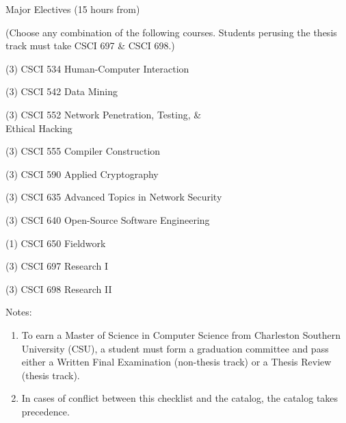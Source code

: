 \begin{reqgroup}{Major Electives (15 hours from)}
\begin{center}%
(Choose any combination of the following courses. Students perusing the thesis track must take CSCI 697 \& CSCI 698.)\vspace{-0.5em}%
\end{center}%
\begin{checklist}
\begin{minipage}[t]{0.5\linewidth}
	\item (3) CSCI 534  Human-Computer Interaction
	\item (3) CSCI 542  Data Mining
	\item (3) CSCI 552  Network Penetration, Testing, \&\\Ethical Hacking
	\item (3) CSCI 555  Compiler Construction
	\item (3) CSCI 590  Applied Cryptography
\end{minipage}
\begin{minipage}[t]{0.5\linewidth}
	\item (3) CSCI 635  Advanced Topics in Network Security
	\item (3) CSCI 640  Open-Source Software Engineering
	\item (1) CSCI 650  Fieldwork
	\item (3) CSCI 697  Research I
	\item (3) CSCI 698  Research II
\end{minipage}
\end{checklist}
\end{reqgroup}

Notes:%
\begin{enumerate}\footnotesize
	\item To earn a Master of Science in Computer Science from Charleston Southern University (CSU), a student must form a graduation committee and pass either a Written Final Examination (non-thesis track) or a Thesis Review (thesis track).
	\item In cases of conflict between this checklist and the catalog, the catalog takes precedence.
\end{enumerate}